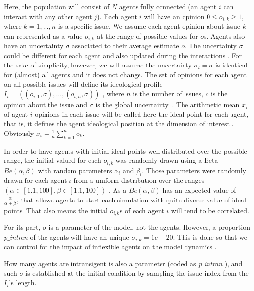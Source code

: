 \documentclass{article}
\begin{document}
Here, the population will consist of  \(N\) agents fully connected (an agent $i$ can interact with any other agent $j$). Each agent $i$ will have an opinion $0\leq o_{i,k} \geq 1$, where $k=1, \ldots, n$ is a specific issue. We assume each agent opinion about issue $k$ can represented as a value $o_{i,k}$ at the range of possible values for $o$s. Agents also have an uncertainty $\sigma$ associated to their average estimate $o$. The uncertainty $\sigma$ could be different for each agent and also updated during the interactions \cite{martins08c}. For the sake of simplicity, however, we will assume the uncertainty $\sigma_i =\sigma$ is identical for (almost) all agents and it does not change. The set of opinions for each agent on all possible issues will define its ideological profile
\(I_i
=
(
(o_{i, 1}, \sigma),
\ldots,
(o_{i, n}, \sigma)
)
\)
, where \(n\) is the number of issues, \(o\) is
the opinion about the issue and \(\sigma\) is the global  uncertainty~\cite{martins12b}. The arithmetic mean  $x_i$  of agent $i$ opinions in each issue will be called here the ideal point for each agent, that is, it defines the agent ideological position at the
dimension of interest \cite{armstrong2014analyzing}. Obviously
\(
x_i
=
\frac{1}{n}
\sum_{k=1}^{n}
o_{k}
\).

In order to have agents with initial ideal points well distributed over the
possible range, the initial valued for each \(o_{i, k}\) was randomly drawn
using a Beta \(Be(\alpha, \beta)\) with random parameters $\alpha_i$ and
$\beta_i$. Those parameters were randomly drawn for each agent $i$ from a
uniform distribution over the ranges \( ( \alpha \in [1.1, 100], \beta \in [1.1,
100] ) \) .  As a \(Be(\alpha, \beta)\) has an
expected value of $\frac{\alpha}{\alpha+\beta}$, that allows agents to start
each simulation with quite diverse value of ideal points. That also means the
initial \(o_{i, k}\)s of each agent $i$ will tend to be correlated.

For its part, \(\sigma\) is a parameter of the model, not the agents. However, a
proportion \textit{p$\_$intran} of the agents will have an unique \(\sigma_{i,k}
= 1e-20\). This is done so that we can control for the impact of inflexible
agents on the model dynamics \cite{galam05b,deffuant2002can,martinsgalam13a}.


How many agents are intransigent is also a parameter (coded as
\textit{p$\_$intran} ), and such \(\sigma\) is established at the initial
condition by sampling the issue index from the \(I_i\)'s length.
\end{document}
